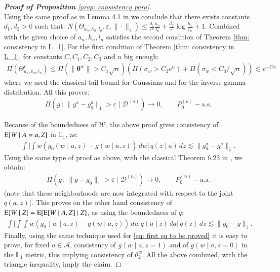 \begin{proof}[\hypertarget{proof of prop para}{\textbf{Proof of Proposition}} \ref{prop: consistency para}]
$$$$
Using the same proof as in Lemma 4.1 in \cite{200} we conclude that there exists constants $d_1,d_2 >0$ such that: $N( \Theta_{a_n,h_n,l_n}, \varepsilon, \|\cdot \|_1) \leq \frac{ d_1}{\varepsilon^2} \frac{a_n}{l_n}  + \frac{d_2}{\varepsilon}\log{\frac{h_n}{l_n}}  + 1$. Combined with the given choice of $a_n,h_n,l_n$ satisfies the second condition of Theorem \ref{thm: consistency in L_1}. For the first condition of Theorem \ref{thm: consistency in L_1}, for constants $C,C_1,C_2,C_3$ and $n$ big enough: 
\begin{align*}
    \Pi(\Theta^c_{a_n,h_n,l_n}) \leq  \Pi(\|\boldsymbol{\theta}^w \| > C_1 \sqrt{n}) (\Pi( \sigma_w > C_2 e^n) + \Pi( \sigma_w < C_3/ \sqrt{n}) ) \lesssim e^{-Cn}
\end{align*}
where we used the classical tail bound for Gaussians and for the inverse gamma distribution. All this proves:
\begin{align*}\label{eq: first eq to be proved}
    \Pi ( g \, : \, \| g^a - g_0^a \|_1 > \varepsilon \mid \mathcal{D}^{(n)}) \rightarrow 0, \quad \quad P^{(n)}_0-\text{a.s.}
\end{align*}

Because of the boundedness of $\mathcal{W}$, the above proof gives consistency of $\mathrm{E}[W \mid A=a, Z]$ in $\mathbb{L}_1$, as:
\begin{align*}
    \int \bigg| \int w (g_0 (w \mid a,z) - g (w \mid a,z) ) \, dw \bigg| \, q(z \mid a) \, dz \lesssim \|g_0^a - g^a\|_1. 
\end{align*}
Using the same type of proof as above, with the classical Theorem 6.23 in \cite{4}, we obtain: 
\begin{align*}
    \Pi ( g \, : \, \| g - g_0 \|_1 > \varepsilon \mid \mathcal{D}^{(n)}) \rightarrow 0, \quad \quad P^{(n)}_0-\text{a.s.}
\end{align*}
(note that these neighborhoods are now integrated with respect to the joint $q(a,z)$). This proves on the other hand consistency of $\mathrm{E}[W \mid Z] = \mathrm{E}[ \mathrm{E}[W \mid A,Z] \mid Z]$, as using the boundedness of $q$:
\begin{align*}
    \int \bigg| \int \int w (g_0 (w \mid a,z) - g (w \mid a,z) ) \, dw  \, q(a \mid z) \, da  \bigg| \, q(z) \, dz \lesssim \|g_0 - g\|_1. 
\end{align*}
Finally, using the same technique used for \eqref{eq: first eq to be proved} it is easy to prove, for fixed $a \in \mathcal{A}$, consistency of $g(w \mid a,z=1)$ and of $g(w \mid a,z=0)$ in the $\mathbb{L}_1$ metric, this implying consistency of $\theta^w_2$. All the above combined, with the triangle inequality, imply the claim.
\end{proof}

